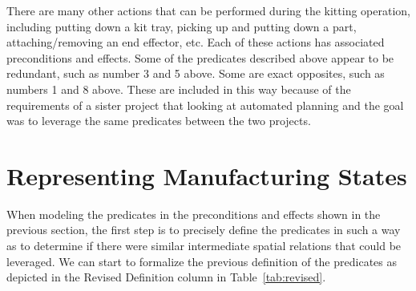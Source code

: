 \documentclass[preprint,12pt]{elsarticle}
\begin{document}
There are many other actions that can be performed during the kitting operation, including putting down a kit tray, picking up and putting down a part, attaching/removing an end effector, etc. Each of these actions has associated preconditions and effects. Some of the predicates described above appear to be redundant, such as number 3 and 5 above. Some are exact opposites, such as numbers 1 and 8 above. These are included in this way because of the requirements of a sister project that looking at automated planning and the goal was to leverage the same predicates between the two projects.

\section{Representing Manufacturing States}\label{S:section4}
When modeling the predicates in the preconditions and effects shown in the previous section, the first step is to precisely define the predicates in such a way as to determine if there were similar intermediate spatial relations that could be leveraged. We can start to formalize the previous definition of the predicates as depicted in the Revised Definition column in Table~\ref{tab:revised}.
\end{document}
